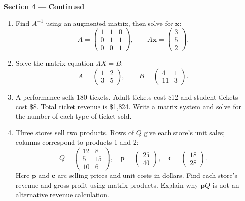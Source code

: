 \documentclass[11pt]{article}
\begin{document}
\newpage
\begin{center}{\large\textbf{Section 4 --- Continued}}\end{center}
\begin{enumerate}[leftmargin=*,itemsep=0pt,resume=chapterEleven]
  \item Find $A^{-1}$ using an augmented matrix, then solve for $\mathbf x$:
  \[
    A=\begin{pmatrix}1&1&0\\0&1&1\\0&0&1\end{pmatrix},\qquad
    A\mathbf x=\begin{pmatrix}3\\5\\2\end{pmatrix}.
  \]
  \par{}

  \item Solve the matrix equation $AX=B$:
  \[
    A=\begin{pmatrix}1&2\\3&5\end{pmatrix},\qquad
    B=\begin{pmatrix}4&1\\11&3\end{pmatrix}.
  \]
  \par{}

  \item A performance sells $180$ tickets. Adult tickets cost \$12 and
  student tickets cost \$8. Total ticket revenue is \$1,824.
  Write a matrix system and solve for the number of each type of ticket sold.
  \par{}

  \item Three stores sell two products. Rows of $Q$ give each store's unit
  sales; columns correspond to products 1 and 2:
  \[
    Q=\begin{pmatrix}12&8\\5&15\\10&6\end{pmatrix},\quad
    \mathbf p=\begin{pmatrix}25\\40\end{pmatrix},\quad
    \mathbf c=\begin{pmatrix}18\\28\end{pmatrix}.
  \]
  Here $\mathbf p$ and $\mathbf c$ are selling prices and unit costs in dollars.
  Find each store's revenue and gross profit using matrix products.
  Explain why $\mathbf pQ$ is not an alternative revenue calculation.
  \par{}
\end{enumerate}
\end{document}
